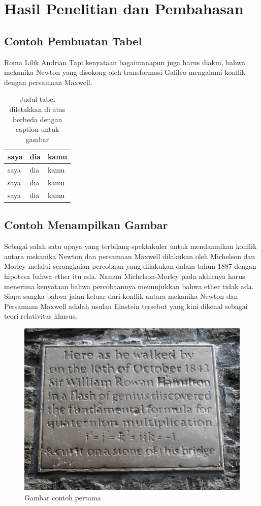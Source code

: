 \chapter{Hasil Penelitian dan Pembahasan}


\section{Contoh Pembuatan Tabel}

Roma Lilik Andrian Tapi kenyataan bagaimanapun juga harus diakui, bahwa mekanika Newton yang disokong oleh transformasi Galileo mengalami konflik dengan persamaan Maxwell. 

\begin{table}[h]
\centering
\caption{Judul tabel diletakkan di atas berbeda dengan caption untuk gambar}
\label{tab:tabelpertama}
\begin{tabular}{|l|l|l|}
\hline
saya & dia & kamu \\
\hline
saya & dia & kamu \\
saya & dia & kamu \\
saya & dia & kamu \\
\hline
\end{tabular}

\end{table}

\section{Contoh Menampilkan Gambar}
Sebagai salah satu upaya yang terbilang spektakuler untuk mendamaikan konflik antara mekanika Newton dan persamaan Maxwell dilakukan oleh Michelson dan Morley melalui serangkaian percobaan yang dilakukan dalam tahun 1887 dengan hipotesa bahwa ether itu ada. Namun Michelson-Morley pada akhirnya harus menerima kenyataan bahwa percobaannya menunjukkan bahwa ether tidak ada. Siapa sangka bahwa jalan keluar dari konflik antara mekanika Newton dan Persamaan Maxwell adalah usulan Einstein tersebut yang kini dikenal sebagai teori relativitas khusus.

\begin{figure}[h]
\centering
\includegraphics[scale=0.8]{gambarcontoh.jpg}
\caption{Gambar contoh pertama}
\label{gbr:gambarpertama}
\end{figure}

